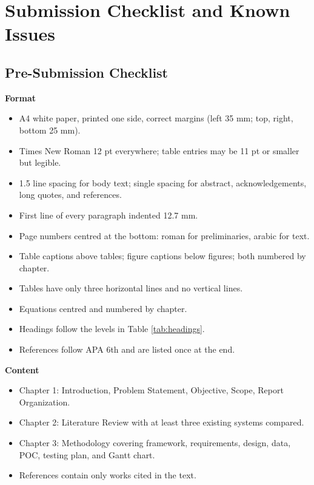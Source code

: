 \chapter{Submission Checklist and Known Issues}
\label{chap:checklist}

\section{Pre-Submission Checklist}

\textbf{Format}

\begin{itemize}
    \item A4 white paper, printed one side, correct margins (left 35 mm; top, right, bottom 25 mm).
    \item Times New Roman 12 pt everywhere; table entries may be 11 pt or smaller but legible.
    \item 1.5 line spacing for body text; single spacing for abstract, acknowledgements, long quotes, and references.
    \item First line of every paragraph indented 12.7 mm.
    \item Page numbers centred at the bottom: roman for preliminaries, arabic for text.
    \item Table captions above tables; figure captions below figures; both numbered by chapter.
    \item Tables have only three horizontal lines and no vertical lines.
    \item Equations centred and numbered by chapter.
    \item Headings follow the levels in Table \ref{tab:headings}.
    \item References follow APA 6th and are listed once at the end.
\end{itemize}

\textbf{Content}

\begin{itemize}
    \item Chapter 1: Introduction, Problem Statement, Objective, Scope, Report Organization.
    \item Chapter 2: Literature Review with at least three existing systems compared.
    \item Chapter 3: Methodology covering framework, requirements, design, data, POC, testing plan, and Gantt chart.
    \item References contain only works cited in the text.
\end{itemize}

